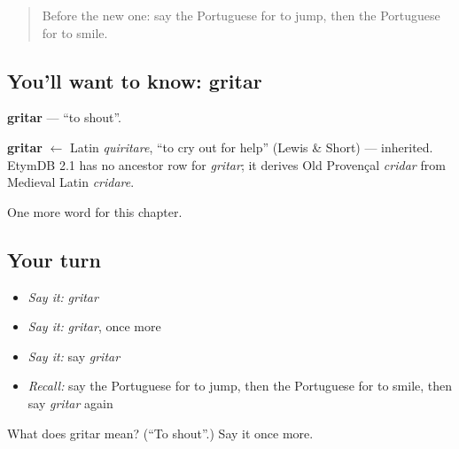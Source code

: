 \begin{quote}
Before the new one: say the Portuguese for to jump, then the Portuguese for to smile.
\end{quote}

\subsection*{You'll want to know: gritar}
\textbf{gritar} — \textquotedblleft{}to shout\textquotedblright{}.

\begin{cousinweb}
\textbf{gritar} $\leftarrow$ Latin \emph{quiritare}, \textquotedblleft{}to cry out for help\textquotedblright{} (Lewis \& Short) — inherited. EtymDB 2.1 has no ancestor row for \emph{gritar}; it derives Old Provençal \emph{cridar} from Medieval Latin \emph{cridare}.
\end{cousinweb}

\begin{grammarlens}[title={What you've built}]
One more word for this chapter.
\end{grammarlens}

\subsection*{Your turn}
\begin{itemize}
\raggedright
  \item \emph{Say it:} \emph{gritar}
  \item \emph{Say it:} \emph{gritar}, once more
  \item \emph{Say it:} say \emph{gritar}
  \item \emph{Recall:} say the Portuguese for to jump, then the Portuguese for to smile, then say \emph{gritar} again
\end{itemize}

\begin{tcolorbox}[breakable,colback=teal!4,colframe=teal!35!black,title={Before you move on}]
What does gritar mean? (\textquotedblleft{}To shout\textquotedblright{}.) Say it once more.
\end{tcolorbox}
